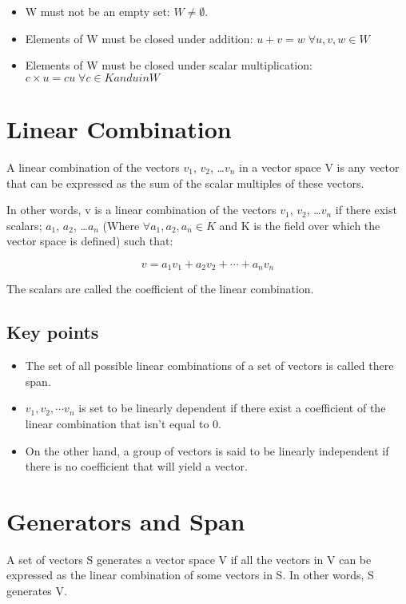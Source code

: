 \documentclass{book}
\begin{document}
\begin{itemize}
	\item W must not be an empty set: \(W \neq \emptyset\).
	\item Elements of W must be closed under addition: \(u + v = w \; \forall u, v, w \in W\)
	\item Elements of W must be closed under scalar multiplication: \(c \times u = cu \; \forall c \in K and u in W\)
\end{itemize}

\section{Linear Combination}
A linear combination of the vectors \(v_1\), \(v_2\), \ldots \(v_n\) in a vector space V is any vector that can be expressed as the sum of the scalar multiples of these vectors.

In other words, v is a linear combination of the vectors \(v_1\), \(v_2\), \ldots \(v_n\) if there exist scalars; \(a_1\), \(a_2\), \ldots \(a_n\) (Where \(\forall a_1, a_2, a_n \in K\) and K is the field over which the vector space is defined) such that:

\[v = a_1 v_1 + a_2 v_2 + \cdots + a_n v_n\]

The scalars are called the coefficient of the linear combination.

\subsection{Key points}
\begin{itemize}
	\item The set of all possible linear combinations of a set of vectors is called there span.
	\item \(v_1, v_2, \cdots v_n\) is set to be linearly dependent if there exist a coefficient of the linear combination that isn't equal to 0.
	\item On the other hand, a group of vectors is said to be linearly independent if there is no coefficient that will yield a vector.
\end{itemize}

\section{Generators and Span}
A set of vectors S generates a vector space V if all the vectors in V can be expressed as the linear combination of some vectors in S. In other words, S generates V.
\end{document}
